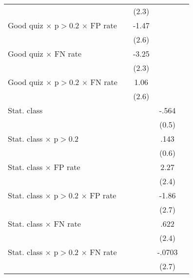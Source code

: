 {\begin{tabular}{l*{4}{c}}
                &                  &    (2.3)         &                  &                  \\
Good quiz $\times$ p$>$0.2 $\times$ FP rate&                  &    -1.47         &                  &                  \\
                &                  &    (2.6)         &                  &                  \\
Good quiz $\times$ FN rate&                  &    -3.25         &                  &                  \\
                &                  &    (2.3)         &                  &                  \\
Good quiz $\times$ p$>$0.2 $\times$ FN rate&                  &     1.06         &                  &                  \\
                &                  &    (2.6)         &                  &                  \\
Stat. class     &                  &                  &    -.564         &                  \\
                &                  &                  &    (0.5)         &                  \\
Stat. class $\times$ p$>$0.2&                  &                  &     .143         &                  \\
                &                  &                  &    (0.6)         &                  \\
Stat. class $\times$ FP rate&                  &                  &     2.27         &                  \\
                &                  &                  &    (2.4)         &                  \\
Stat. class $\times$ p$>$0.2 $\times$ FP rate&                  &                  &    -1.86         &                  \\
                &                  &                  &    (2.7)         &                  \\
Stat. class $\times$ FN rate&                  &                  &     .622         &                  \\
                &                  &                  &    (2.4)         &                  \\
Stat. class $\times$ p$>$0.2 $\times$ FN rate&                  &                  &   -.0703         &                  \\
                &                  &                  &    (2.7)         &                  \\

\end{tabular}}
